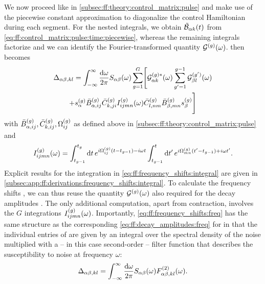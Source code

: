 We now proceed like in \cref{subsec:ff:theory:control_matrix:pulse} and make use of the piecewise constant approximation to diagonalize the control Hamiltonian during each segment.
For the nested integrals, we obtain $\tilde{\mathcal{B}}_{\alpha k}(t)$ from \cref{eq:ff:control_matrix:pulse:time:piecewise}, whereas the remaining integrals factorize and we can identify the Fourier-transformed quantity $\mathcal{G}^{(g)}(\omega)$.
 then becomes
\begin{multline}\label{eq:ff:frequency_shifts:freq}
\Delta_{\alpha\beta,kl} = \int_{-\infty}^\infty\frac{\dd{\omega}}{2\pi} S_{\alpha\beta}(\omega)\sum_{g=1}^G\Biggl[
    \mathcal{G}_{\alpha k}^{(g)\ast}(\omega)\sum_{g'=1}^{g-1}\mathcal{G}_{\beta l}^{(g')}(\omega) \\
    + s_\alpha^{(g)}\bar{B}_{\alpha,ij}^{(g)}\bar{C}_{k,ji}^{(g)} I_{ijmn}^{(g)}(\omega)
    \bar{C}_{l,nm}^{(g)}\bar{B}_{\beta,mn}^{(g)} s_\beta^{(g)}
    \Biggr]
\end{multline}
with $\bar{B}_{\alpha,ij}^{(g)},\bar{C}_{k,ij}^{(g)},\Omega_{ij}^{(g)}$ as defined above in \cref{subsec:ff:theory:control_matrix:pulse} and
\begin{equation}\label{eq:ff:frequency_shifts:integral}
I_{ijmn}^{(g)}(\omega) = \int_{t_{g-1}}^{t_g}\dd{t}e^{i\Omega_{ij}^{(g)}(t - t_{g-1}) - i\omega t}
\int_{t_{g-1}}^{t}\dd{t'}e^{i\Omega_{mn}^{(g)}(t' - t_{g-1}) + i\omega t'}.
\end{equation}
Explicit results for the integration in \cref{eq:ff:frequency_shifts:integral} are given in \cref{subsec:app:ff:derivations:frequency_shifts:integral}.
To calculate the frequency shifts \freqshifts, we can thus reuse the quantity $\mathcal{G}^{(g)}(\omega)$ also required for the decay amplitudes \decayamps.
The only additional computation, apart from contraction, involves the $G$ integrations $I_{ijmn}^{(g)}(\omega)$.
Importantly, \cref{eq:ff:frequency_shifts:freq} has the same structure as the corresponding \cref{eq:ff:decay_amplitudes:freq} for \decayamps in that the individual entries of \freqshifts are given by an integral over the spectral density of the noise multiplied with a -- in this case second-order -- filter function that describes the susceptibility to noise at frequency $\omega$:
\begin{equation}\label{eq:ff:frequency_shifts:filter_function}
\Delta_{\alpha\beta,kl} = \int_{-\infty}^\infty\frac{\dd{\omega}}{2\pi} S_{\alpha\beta}(\omega) F_{\alpha\beta,kl}^{(2)}(\omega).
\end{equation}

